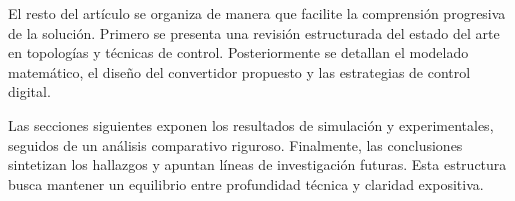 El resto del artículo se organiza de manera que facilite la comprensión progresiva de la solución. Primero se presenta una revisión estructurada del estado del arte en topologías y técnicas de control. Posteriormente se detallan el modelado matemático, el diseño del convertidor propuesto y las estrategias de control digital. 

Las secciones siguientes exponen los resultados de simulación y experimentales, seguidos de un análisis comparativo riguroso. Finalmente, las conclusiones sintetizan los hallazgos y apuntan líneas de investigación futuras. Esta estructura busca mantener un equilibrio entre profundidad técnica y claridad expositiva.